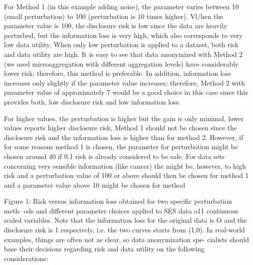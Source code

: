 \documentclass[]{article}
\begin{document}
For Method 1 (in this example adding noise), the parameter varies between 10
(small perturbation) to 100 (perturbation is 10 times higher). Vl/hen the parameter
value is 100, the disclosure risk is low since the data are heavily perturbed, but the
information loss is very high, which also corresponds to very low data utility. When
only low perturbation is applied to a dataset, both risk and data utility are high. It
is easy to see that data anonymized with Method 2 (we used microaggregation with
different aggregation levels) have considerably lower risk; therefore, this method
is preferable. In addition, information loss increases only slightly if the parameter
value increases; therefore, Method 2 with parameter value of approximately 7
would be a good choice in this case since this provides both, low disclosure risk
and low information loss. 
\newpage

For higher values, the perturbation is higher but the
gain is only minimal, lower values reports higher disclosure risk, Method 1 should
not be chosen since the disclosure risk and the information loss is higher than for
method 2. However, if for some reasons method 1 is chosen, the parameter for
perturbation might be chosen around 40 if 0.1 risk is already considered to be
safe. For data sets concerning very sensible information (like cancer) the might
be, however, to high risk and a perturbation value of 100 or above should then be
chosen for method 1 and a parameter value above 10 might be chosen for method


Figure 1: Risk versus information loss obtained for two specific perturbation meth-
ods and different parameter choices applied to SES data o11 continuous
scaled variables. Note that the information loss for the original data is
O and the disclosure risk is 1 respecively, i.e. the two curves starts from
(1,0).
In real-world examples, things are often not as clear, so data anonymization spe-
cialists should base their decisions regarding risk and data utility on the following
considerations:
%
%
%
\end{document}
